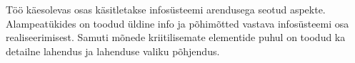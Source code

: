 Töö käesolevas osas käsitletakse infosüsteemi arendusega seotud aspekte. Alampeatükides on toodud üldine info ja põhimõtted vastava infosüsteemi osa
realiseerimisest. Samuti mõnede kriitilisemate elementide puhul on toodud ka detailne lahendus ja lahenduse valiku põhjendus. 



